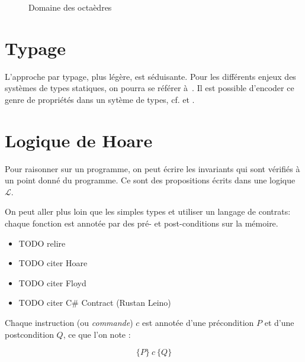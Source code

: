 \begin{figure}%
  \centering

  \caption{Domaine des octaèdres}
  \label{fig:dom-octo}
\end{figure}%

\section{Typage}

L'approche par typage, plus légère, est séduisante. Pour les différents enjeux
des systèmes de types statiques, on pourra se référer à~\cite{TAPL}. Il est
possible d'encoder ce genre de propriétés dans un sytème de types, cf.
\cite{lightweight-static-capabilities} et \cite{LZ06a}.

\section{Logique de Hoare}

Pour raisonner sur un programme, on peut écrire les invariants qui sont vérifiés
à un point donné du programme. Ce sont des propositions écrits dans une logique
$\mathcal{L}$.

On peut aller plus loin que les simples types et utiliser un langage de contrats:
chaque fonction est annotée par des pré- et post-conditions sur la
mémoire.

\begin{itemize}
\item TODO relire \cite{cssv}
\item TODO citer Hoare\cite{hoare}
\item TODO citer Floyd\cite{FloydMeaning}
\item TODO citer C\# Contract (Rustan Leino)\cite{krml136}
\end{itemize}

Chaque instruction (ou \emph{commande}) $c$ est annotée d'une précondition $P$
et d'une postcondition $Q$, ce que l'on note :

\def\hoare#1#2#3{\ensuremath{\{#1\}~#2~\{#3\}}}

\[
\hoare{P}{c}{Q}
\]

